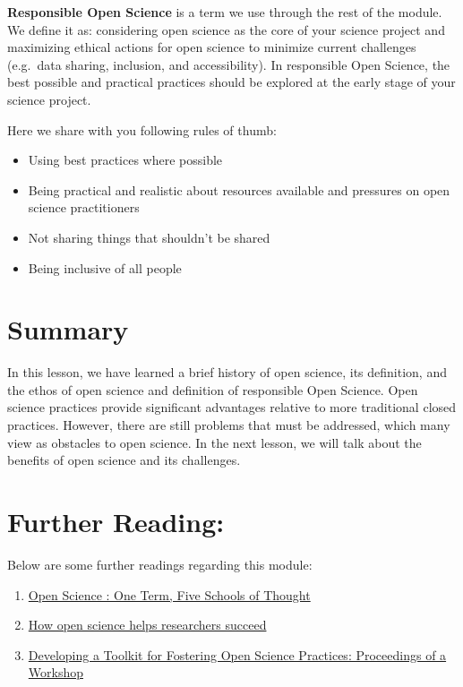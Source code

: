 \documentclass[
  letterpaper,
  DIV=11,
  numbers=noendperiod]{scrreport}
\providecommand{\tightlist}{%
  \setlength{\itemsep}{0pt}\setlength{\parskip}{0pt}}\usepackage{longtable,booktabs,array}
\begin{document}

\textbf{Responsible Open Science} is a term we use through the rest of
the module. We define it as: considering open science as the core of
your science project and maximizing ethical actions for open science to
minimize current challenges (e.g.~data sharing, inclusion, and
accessibility). In responsible Open Science, the best possible and
practical practices should be explored at the early stage of your
science project.

Here we share with you following rules of thumb:

\begin{itemize}
\tightlist
\item
  Using best practices where possible
\item
  Being practical and realistic about resources available and pressures
  on open science practitioners
\item
  Not sharing things that shouldn't be shared
\item
  Being inclusive of all people
\end{itemize}

\hypertarget{summary}{%
\section*{Summary}\label{summary}}


In this lesson, we have learned a brief history of open science, its
definition, and the ethos of open science and definition of responsible
Open Science. Open science practices provide significant advantages
relative to more traditional closed practices. However, there are still
problems that must be addressed, which many view as obstacles to open
science. In the next lesson, we will talk about the benefits of open
science and its challenges.

\hypertarget{further-reading}{%
\section*{Further Reading:}\label{further-reading}}


Below are some further readings regarding this module:

\begin{enumerate}
\def\labelenumi{\arabic{enumi}.}
\tightlist
\item
  \href{https://link.springer.com/chapter/10.1007/978-3-319-00026-8_2}{Open
  Science : One Term, Five Schools of Thought}
\item
  \href{https://elifesciences.org/articles/16800}{How open science helps
  researchers succeed}
\item
  \href{https://nap.nationalacademies.org/read/26308/chapter/1}{Developing
  a Toolkit for Fostering Open Science Practices: Proceedings of a
  Workshop}
\end{enumerate}
\end{document}
